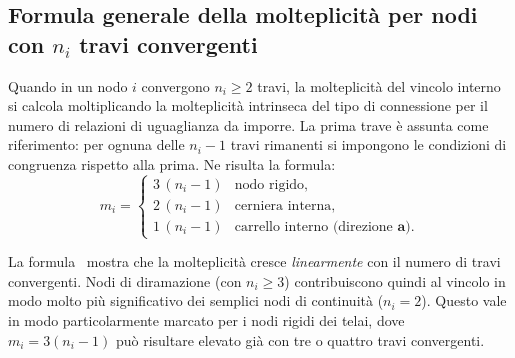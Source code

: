 \subsection{Formula generale della molteplicità per nodi
	con $n_i$ travi convergenti}
\label{subsec:molt_generale}

Quando in un nodo $i$ convergono $n_i \geq 2$ travi,
la molteplicità del vincolo interno si calcola
moltiplicando la molteplicità intrinseca del tipo
di connessione per il numero di relazioni di uguaglianza
da imporre. La prima trave è assunta come riferimento:
per ognuna delle $n_i - 1$ travi rimanenti si impongono
le condizioni di congruenza rispetto alla prima.
Ne risulta la formula:
\begin{equation}\label{eq:molt_nodo}
	m_i =
	\begin{cases}
		3\,(n_i - 1) & \text{nodo rigido,} \\[4pt]
		2\,(n_i - 1) & \text{cerniera interna,} \\[4pt]
		1\,(n_i - 1) & \text{carrello interno (direzione } \bm{a}\text{).}
	\end{cases}
\end{equation}

\begin{oss}
	La formula~ mostra che la
	molteplicità cresce \emph{linearmente} con il numero
	di travi convergenti. Nodi di diramazione (con $n_i \geq 3$)
	contribuiscono quindi al vincolo in modo molto più
	significativo dei semplici nodi di continuità ($n_i = 2$).
	Questo vale in modo particolarmente marcato per i nodi
	rigidi dei telai, dove $m_i = 3(n_i - 1)$ può
	risultare elevato già con tre o quattro travi convergenti.
\end{oss}

